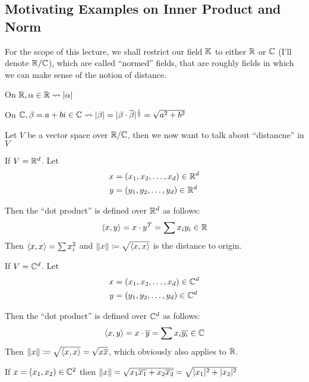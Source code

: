 
\subsection{Motivating Examples on Inner Product and Norm}
\begin{remark}
    For the scope of this lecture, we shall restrict our field \(\mathbb{K}\) to either \(\mathbb{R}\) or \(\mathbb{C}\) (I'll denote \(\mathbb{R} / \mathbb{C}\)), which are called ``normed'' fields, that are roughly fields in which we can make sense of the notion of distance.
\end{remark}

\begin{example}
    On \(\mathbb{R}, \alpha \in \mathbb{R} \leadsto \lvert\alpha\rvert\)

    On \(\mathbb{C}, \beta = a + bi \in \mathbb{C} \leadsto \lvert\beta\rvert = \lvert\beta \cdot \overline{\beta}\rvert^{\frac{1}{2}} = \sqrt{a^2 + b^2}\)
\end{example}

Let \(V\) be a vector space over \(\mathbb{R} /\mathbb{C}\), then we now want to talk about ``distancne'' in \(V\)

\begin{example}
    If \(V = \mathbb{R}^d\). Let \begin{align*}
        x & = (x_1, x_2, \dots, x_d) \in \mathbb{R}^d \\
        y & = (y_1, y_2, \dots, y_d) \in \mathbb{R}^d
    \end{align*}

    Then the ``dot product'' is defined over \(\mathbb{R}^d\) as follows: \[
        \langle x, y \rangle = x \cdot y^T = \sum x_i y_i \in \mathbb{R}
    \]
    Then \(\langle x, x \rangle = \sum x_i^2\) and \(\lVert x\rVert \coloneqq \sqrt{\langle x, x \rangle}\) is the distance to origin.
\end{example}


\begin{example}
    If \(V = \mathbb{C}^d\). Let \begin{align*}
        x & = (x_1, x_2, \dots, x_d) \in \mathbb{C}^d \\
        y & = (y_1, y_2, \dots, y_d) \in \mathbb{C}^d
    \end{align*}

    Then the ``dot product'' is defined over \(\mathbb{C}^d\) as follows: \[
        \langle x, y \rangle = x \cdot \overline{y} =\sum x_i \overline{y_i}  \in \mathbb{C}
    \]
    Then \(\lVert x\rVert \coloneqq \sqrt{\langle x, x \rangle} = \sqrt{x \overline{x}}\), which obviously also applies to \(\mathbb{R}\).

    If \(x = (x_1, x_2) \in \mathbb{C}^2\) then \(\lVert x\rVert = \sqrt{x_1 \overline{x_1} + x_2 \overline{x_2}} = \sqrt{\lvert x_1\rvert^2 + \lvert x_2\rvert^2}\)
\end{example}

